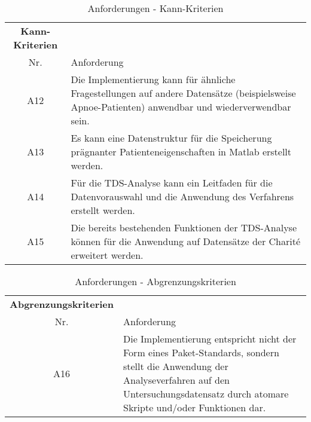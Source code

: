 \begin{table}[H] 
\begin{tabularx}{\textwidth}{cllX}
\toprule
\multicolumn{3}{c}{\textbf{Kann-Kriterien}} & \\  
\cmidrule{1-3}
\multicolumn{3}{c}{Nr.} & Anforderung\\ 
\midrule 
\multicolumn{3}{c}{A12} &  Die Implementierung kann für ähnliche Fragestellungen auf andere Datensätze (beispielsweise Apnoe-Patienten) anwendbar und wiederverwendbar sein.\\
\multicolumn{3}{c}{A13} & Es kann eine Datenstruktur für die Speicherung prägnanter Patienteneigenschaften in Matlab erstellt werden.\\
\multicolumn{3}{c}{A14} & Für die \acs{TDS}-Analyse kann ein Leitfaden für die Datenvorauswahl und die Anwendung des Verfahrens erstellt werden.\\ 
\multicolumn{3}{c}{A15} & Die bereits bestehenden Funktionen der \acs{TDS}-Analyse können für die Anwendung auf Datensätze der Charit\'{e} erweitert werden.\\ 
\bottomrule
\end{tabularx}
\caption{Anforderungen - Kann-Kriterien}
\label{tab:Kann-Kriterien}
\end{table}


\begin{table}[H] 
\begin{tabularx}{\textwidth}{cllX}
\toprule
\multicolumn{3}{c}{\textbf{Abgrenzungskriterien}} & \\  
\cmidrule{1-3}
\multicolumn{3}{c}{Nr.} & Anforderung\\ 
\midrule 
\multicolumn{3}{c}{A16} &  Die Implementierung entspricht nicht der Form eines Paket-Standards, sondern stellt die Anwendung der Analyseverfahren auf den Untersuchungsdatensatz durch atomare Skripte und/oder Funktionen dar.\\
\bottomrule
\end{tabularx}
\caption{Anforderungen - Abgrenzungskriterien}
\label{tab:Abgr-Kriterien}
\end{table}
